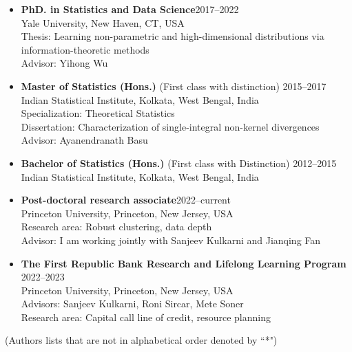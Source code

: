 \documentclass[letterpaper,11pt,oneside]{article}
\theoremstyle{definition}
\begin{document}
	\begin{itemize}
		\item[] {\bf PhD. in Statistics and Data Science}\hfill 2017--2022\\
		Yale University, New Haven, CT, USA\\
		Thesis: Learning non-parametric and high-dimensional distributions via information-theoretic
		methods \\
		Advisor: Yihong Wu  
		
		\item[] {\bf 	Master of Statistics (Hons.)} (First class with distinction) \hfill 2015--2017\\
		Indian Statistical Institute, Kolkata, West Bengal, India\\
		Specialization: Theoretical Statistics\\
		Dissertation: Characterization of single-integral non-kernel divergences \\
		Advisor: Ayanendranath Basu
		
		\item[] 
		{\bf Bachelor of Statistics (Hons.)} (First class with Distinction) \hfill 2012--2015 \\
		{Indian Statistical Institute, Kolkata, West Bengal, India}  
	\end{itemize}
	
	
	\begin{itemize}
		\item[] {\bf Post-doctoral research associate}\hfill 2022--current\\
		 Princeton University, Princeton, New Jersey, USA\\
		Research area: Robust clustering, data depth\\
		Advisor: I am working jointly with Sanjeev Kulkarni and Jianqing Fan  
		
		\item[] {\bf The First Republic Bank Research and Lifelong Learning Program} \hfill 2022--2023\\
		Princeton University, Princeton, New Jersey, USA\\
		Advisors: Sanjeev Kulkarni, Roni Sircar, Mete Soner\\
		Research area: Capital call line of credit, resource planning
		
	\end{itemize}



	 (Authors lists that are not in alphabetical order denoted by ``*")
	
\end{document}
